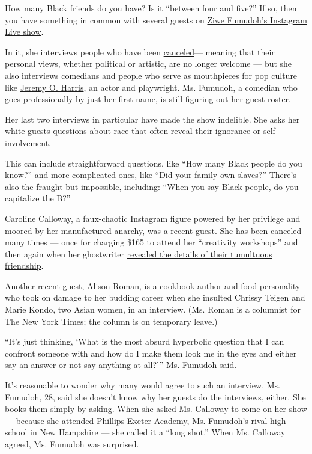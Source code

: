 How many Black friends do you have? Is it ``between four and five?'' If
so, then you have something in common with several guests on
\href{https://www.instagram.com/ziwef/?hl=en}{Ziwe Fumudoh's Instagram
Live show}.

In it, she interviews people who have been
\href{https://www.nytimes.com/2018/06/28/style/is-it-canceled.html}{canceled}---
meaning that their personal views, whether political or artistic, are no
longer welcome --- but she also interviews comedians and people who
serve as mouthpieces for pop culture like
\href{https://www.nytimes.com/2016/08/18/style/jeremy-o-harris-actor-playwright-yale-james-franco.html}{Jeremy
O. Harris}, an actor and playwright. Ms. Fumudoh, a comedian who goes
professionally by just her first name, is still figuring out her guest
roster.

Her last two interviews in particular have made the show indelible. She
asks her white guests questions about race that often reveal their
ignorance or self-involvement.

This can include straightforward questions, like ``How many Black people
do you know?'' and more complicated ones, like ``Did your family own
slaves?'' There's also the fraught but impossible, including: ``When you
say Black people, do you capitalize the B?''

Caroline Calloway, a faux-chaotic Instagram figure powered by her
privilege and moored by her manufactured anarchy, was a recent guest.
She has been canceled many times --- once for charging \$165 to attend
her ``creativity workshops'' and then again when her ghostwriter
\href{https://www.nytimes.com/2019/09/11/style/caroline-calloway-explainer.html}{revealed
the details of their tumultuous friendship}.

Another recent guest, Alison Roman, is a cookbook author and food
personality who took on damage to her budding career when she insulted
Chrissy Teigen and Marie Kondo, two Asian women, in an interview. (Ms.
Roman is a columnist for The New York Times; the column is on temporary
leave.)

``It's just thinking, `What is the most absurd hyperbolic question that
I can confront someone with and how do I make them look me in the eyes
and either say an answer or not say anything at all?''' Ms. Fumudoh
said.

It's reasonable to wonder why many would agree to such an interview. Ms.
Fumudoh, 28, said she doesn't know why her guests do the interviews,
either. She books them simply by asking. When she asked Ms. Calloway to
come on her show --- because she attended Phillips Exeter Academy, Ms.
Fumudoh's rival high school in New Hampshire --- she called it a ``long
shot.'' When Ms. Calloway agreed, Ms. Fumudoh was surprised.

